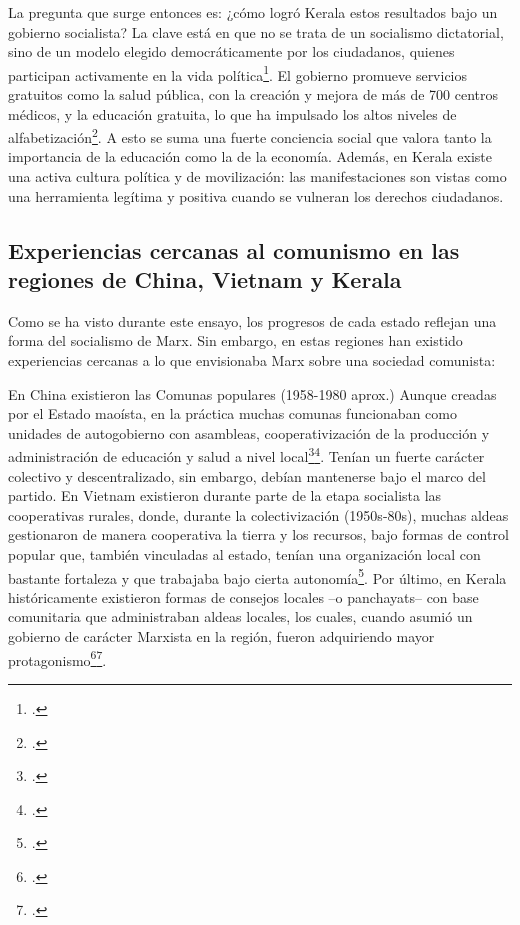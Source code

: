 \documentclass[12pt, letterpaper]{article}
\begin{document}
La pregunta que surge entonces es: ¿cómo logró Kerala estos resultados bajo un gobierno socialista? La clave está en que no se trata de un socialismo dictatorial, sino de un modelo elegido democráticamente por los ciudadanos, quienes participan activamente en la vida política\footcite{wikipedia_sf_activism}. El gobierno promueve servicios gratuitos como la salud pública, con la creación y mejora de más de 700 centros médicos, y la educación gratuita, lo que ha impulsado los altos niveles de alfabetización\footcite{keralatourism_sf}. A esto se suma una fuerte conciencia social que valora tanto la importancia de la educación como la de la economía. Además, en Kerala existe una activa cultura política y de movilización: las manifestaciones son vistas como una herramienta legítima y positiva cuando se vulneran los derechos ciudadanos.

\subsection*{Experiencias cercanas al comunismo en las regiones de China, Vietnam y Kerala}
Como se ha visto durante este ensayo, los progresos de cada estado reflejan una forma del socialismo de Marx. Sin embargo, en estas regiones han existido experiencias cercanas a lo que envisionaba Marx sobre una sociedad comunista:

En China existieron las Comunas populares (1958-1980 aprox.) Aunque creadas por el Estado maoísta, en la práctica muchas comunas funcionaban como unidades de autogobierno con asambleas, cooperativización de la producción y administración de educación y salud a nivel local\footcite{tsai_2002}\footcite{wu_2023}. Tenían un fuerte carácter colectivo y descentralizado, sin embargo, debían mantenerse bajo el marco del partido. En Vietnam existieron durante parte de la etapa socialista las cooperativas rurales, donde, durante la colectivización (1950s-80s), muchas aldeas gestionaron de manera cooperativa la tierra y los recursos, bajo formas de control popular que, también vinculadas al estado, tenían una organización local con bastante fortaleza y que trabajaba bajo cierta autonomía\footcite{nhiem_2008}. Por último, en Kerala históricamente existieron formas de consejos locales –o panchayats– con base comunitaria que administraban aldeas locales, los cuales, cuando asumió un gobierno de carácter Marxista en la región, fueron adquiriendo mayor protagonismo\footcite{isaac_franke_2000}\footcite{elamon_et_al_2021}.

\newpage
\end{document}
